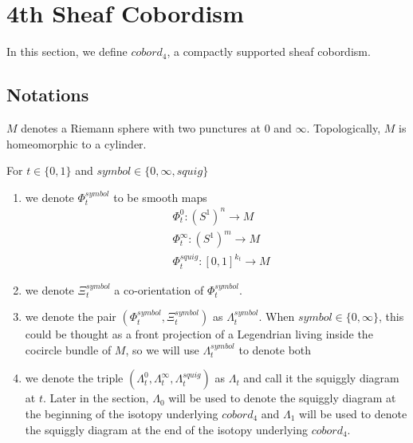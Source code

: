 \section{4th Sheaf Cobordism}
In this section, we define $cobord_4$, a compactly supported sheaf cobordism.
\subsection{Notations}
\begin{definition}
$M$ denotes a Riemann sphere with two punctures at $0$ and $\infty$. Topologically, $M$ is homeomorphic to a cylinder.
\end{definition}
\begin{definition}
For $t\in\{0,1\}$ and $symbol\in\{0,\infty, squig \}$
\begin{enumerate}
\item we denote $\Phi_t^{symbol}$ to be smooth maps
\begin{align*}
&\Phi_t^0 : (S^1)^n \rightarrow M \\
&\Phi_t^\infty : (S^1)^m \rightarrow M \\
&\Phi_t^{squig} : [0,1]^{k_t} \rightarrow M
\end{align*}

\item we denote $\Xi_t^{symbol}$ a co-orientation of $\Phi_t^{symbol}$.

\item we denote the pair $(\Phi_t^{symbol},\Xi_t^{symbol})$ as $\Lambda_t^{symbol}$. When $symbol \in \{0,\infty\}$, this could be thought as a front projection of a Legendrian living inside the cocircle bundle of $M$, so we will use $\Lambda_t^{symbol}$ to denote both

\item we denote the triple $(\Lambda_t^{0},\Lambda_t^{\infty},\Lambda_t^{squig})$ as $\Lambda_t$ and call it the squiggly diagram at $t$. Later in the section, $\Lambda_0$ will be used to denote the squiggly diagram at the beginning of the isotopy underlying $cobord_4$ and $\Lambda_1$ will be used to denote the squiggly diagram at the end of the isotopy underlying $cobord_4$. 
\end{enumerate}
\end{definition}

